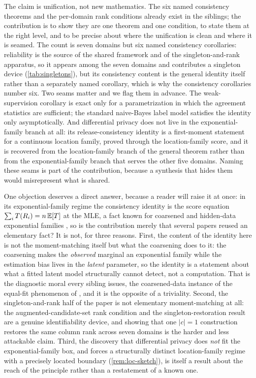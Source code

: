 The claim is unification, not new mathematics. The six named
consistency theorems and the per-domain rank conditions already exist
in the siblings; the contribution is to show they are one theorem and
one condition, to state them at the right level, and to be precise
about where the unification is clean and where it is seamed. The count
is seven domains but six named consistency corollaries: reliability
\citep{towell2026masked} is the source of the shared framework and of
the singleton-and-rank apparatus, so it appears among the seven domains
and contributes a singleton device (\cref{tab:singletons}), but its
consistency content is the general identity itself rather than a
separately named corollary, which is why the consistency corollaries
number six. Two seams
matter and we flag them in advance. The weak-supervision corollary is
exact only for a parametrization in which the agreement statistics are
sufficient; the standard naive-Bayes label model satisfies the
identity only asymptotically. And differential privacy does not live
in the exponential-family branch at all: its release-consistency
identity is a first-moment statement for a continuous location family,
proved through the location-family score, and it is recovered from the
location-family branch of the general theorem rather than from the
exponential-family branch that serves the other five domains. Naming
these seams is part of the contribution, because a synthesis that
hides them would misrepresent what is shared.

One objection deserves a direct answer, because a reader will raise it
at once: in its exponential-family regime the consistency identity is
the score equation $\sum_i T(R_i) = n\,\mathbb{E}[T]$ at the MLE, a fact known
for coarsened and hidden-data exponential families \citep{domke2020moment},
so is the contribution merely that several papers reused an elementary
fact? It is not, for three reasons. First, the content of the identity
here is not the moment-matching itself but what the coarsening does to
it: the coarsening makes the \emph{observed} marginal an exponential
family while the estimation bias lives in the \emph{latent} parameter,
so the identity is a statement about what a fitted latent model
structurally cannot detect, not a computation. That is the diagnostic
moral every sibling issues, the coarsened-data instance of the equal-fit
phenomenon of \citet{molenberghs2008every}, and it is the opposite of a
triviality.
Second, the singleton-and-rank half of the paper is not elementary
moment-matching at all: the augmented-candidate-set rank condition and
the singleton-restoration result are a genuine identifiability device,
and showing that one $|c| = 1$ construction restores the same column
rank across seven domains is the harder and less attackable claim. Third,
the discovery that differential privacy does \emph{not} fit the
exponential-family box, and forces a structurally distinct
location-family regime with a precisely located boundary
(\cref{rem:loc-sketch}), is itself a result about the reach of the
principle rather than a restatement of a known one.

